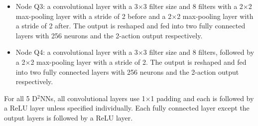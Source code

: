 \documentclass[10pt,twocolumn,letterpaper]{article}
\begin{document}
\begin{itemize}
\item Node Q3:  a convolutional layer with a 3$\times$3 filter size and 8 filters with a 2$\times$2 max-pooling layer with a stride of 2 before
  and a 2$\times$2 max-pooling layer with a stride of 2 after.
  The output is reshaped and fed into two fully connected layers with 256 neurons and the 2-action output respectively.

\item Node Q4:  a convolutional layer with a 3$\times$3 filter size and 8 filters,
  followed by a 2$\times$2 max-pooling layer with a stride of 2.
  The output is reshaped and fed into two fully connected layers with 256 neurons and the 2-action output respectively.

\end{itemize}


For all 5 D$^2$NNs, all convolutional layers use 1$\times$1 padding and each is followed by a ReLU layer unless specified individually.
Each fully connected layer except the output layers is followed by a ReLU layer.

   
{\small   }
\end{document}
